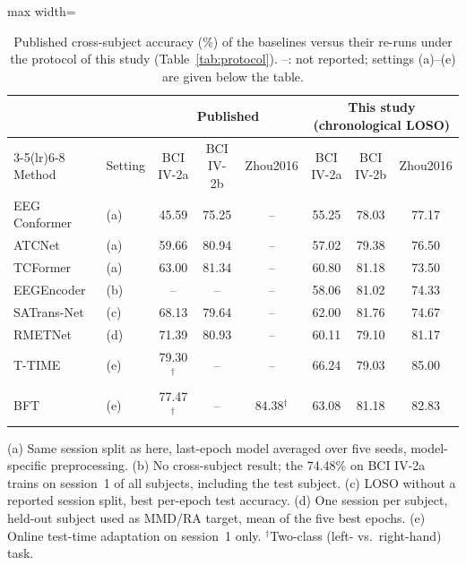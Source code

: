 \documentclass[preprint,12pt]{elsarticle}
\begin{document}
\begin{table}[!htbp]
\centering
\caption{Published cross-subject accuracy (\%) of the baselines versus their re-runs under the protocol of this study (Table~\ref{tab:protocol}). --: not reported; settings (a)--(e) are given below the table.}
\label{tab:published}
\footnotesize
\setlength{\tabcolsep}{4pt}
\begin{adjustbox}{max width=\textwidth}
\begin{tabular}{llccc@{\hspace{14pt}}ccc}
\toprule
 & & \multicolumn{3}{c}{Published} & \multicolumn{3}{c}{This study (chronological LOSO)} \\
\cmidrule(lr){3-5}\cmidrule(lr){6-8}
Method & Setting & BCI IV-2a & BCI IV-2b & Zhou2016 & BCI IV-2a & BCI IV-2b & Zhou2016 \\
\midrule
EEG Conformer~\cite{song2023eegconformer} & (a)~\cite{altaheri2025tcformer} & 45.59 & 75.25 & -- & 55.25 & 78.03 & 77.17 \\
ATCNet~\cite{altaheri2023atcnet} & (a)~\cite{altaheri2025tcformer} & 59.66 & 80.94 & -- & 57.02 & 79.38 & 76.50 \\
TCFormer~\cite{altaheri2025tcformer} & (a) & 63.00 & 81.34 & -- & 60.80 & 81.18 & 73.50 \\
EEGEncoder~\cite{liao2025eegencoder} & (b) & -- & -- & -- & 58.06 & 81.02 & 74.33 \\
SATrans-Net~\cite{miao2025satransnet} & (c) & 68.13 & 79.64 & -- & 62.00 & 81.76 & 74.67 \\
RMETNet~\cite{zhao2026rmetnet} & (d) & 71.39 & 80.93 & -- & 60.11 & 79.10 & 81.17 \\
T-TIME~\cite{li2024ttime} & (e) & 79.30$^{\dagger}$ & -- & -- & 66.24 & 79.03 & 85.00 \\
BFT~\cite{li2026bft} & (e) & 77.47$^{\dagger}$ & -- & 84.38$^{\dagger}$ & 63.08 & 81.18 & 82.83 \\
\bottomrule
\end{tabular}
\end{adjustbox}
\par\smallskip
\begin{minipage}{\textwidth}\scriptsize
(a) Same session split as here, last-epoch model averaged over five seeds, model-specific preprocessing. (b) No cross-subject result; the 74.48\% on BCI IV-2a trains on session~1 of all subjects, including the test subject. (c) LOSO without a reported session split, best per-epoch test accuracy. (d) One session per subject, held-out subject used as MMD/RA target, mean of the five best epochs. (e) Online test-time adaptation on session~1 only. $^{\dagger}$Two-class (left- vs.\ right-hand) task.
\end{minipage}
\end{table}
\end{document}
